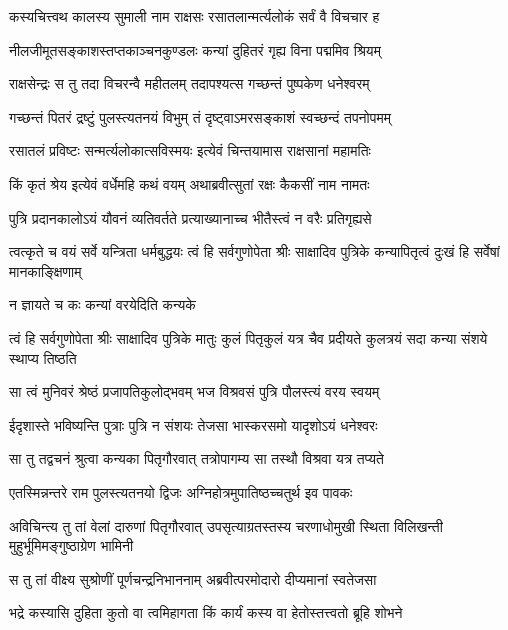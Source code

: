 
\twolineshloka
{कस्यचित्त्वथ कालस्य सुमाली नाम राक्षसः}
{रसातलान्मर्त्यलोकं सर्वं वै विचचार ह} %

\twolineshloka
{नीलजीमूतसङ्काशस्तप्तकाञ्चनकुण्डलः}
{कन्यां दुहितरं गृह्य विना पद्ममिव श्रियम्} %

\twolineshloka
{राक्षसेन्द्रः स तु तदा विचरन्वै महीतलम्}
{तदापश्यत्स गच्छन्तं पुष्पकेण धनेश्वरम्} %

\twolineshloka
{गच्छन्तं पितरं द्रष्टुं पुलस्त्यतनयं विभुम्}
{तं दृष्ट्वाऽमरसङ्काशं स्वच्छन्दं तपनोपमम्} %

\twolineshloka
{रसातलं प्रविष्टः सन्मर्त्यलोकात्सविस्मयः}
{इत्येवं चिन्तयामास राक्षसानां महामतिः} %

\twolineshloka
{किं कृतं श्रेय इत्येवं वर्धेमहि कथं वयम्}
{अथाब्रवीत्सुतां रक्षः कैकसीं नाम नामतः} %

\twolineshloka
{पुत्रि प्रदानकालोऽयं यौवनं व्यतिवर्तते}
{प्रत्याख्यानाच्च भीतैस्त्वं न वरैः प्रतिगृह्यसे} %

\threelineshloka
{त्वत्कृते च वयं सर्वे यन्त्रिता धर्मबुद्धयः}
{त्वं हि सर्वगुणोपेता श्रीः साक्षादिव पुत्रिके}
{कन्यापितृत्वं दुःखं हि सर्वेषां मानकाङ्क्षिणाम्} %

\onelineshloka
{न ज्ञायते च कः कन्यां वरयेदिति कन्यके} %

\threelineshloka
{त्वं हि सर्वगुणोपेता श्रीः साक्षादिव पुत्रिके}
{मातुः कुलं पितृकुलं यत्र चैव प्रदीयते}
{कुलत्रयं सदा कन्या संशये स्थाप्य तिष्ठति} %

\twolineshloka
{सा त्वं मुनिवरं श्रेष्ठं प्रजापतिकुलोद्भवम्}
{भज विश्रवसं पुत्रि पौलस्त्यं वरय स्वयम्} %

\twolineshloka
{ईदृशास्ते भविष्यन्ति पुत्राः पुत्रि न संशयः}
{तेजसा भास्करसमो यादृशोऽयं धनेश्वरः} %

\twolineshloka
{सा तु तद्वचनं श्रुत्वा कन्यका पितृगौरवात्}
{तत्रोपागम्य सा तस्थौ विश्रवा यत्र तप्यते} %

\twolineshloka
{एतस्मिन्नन्तरे राम पुलस्त्यतनयो द्विजः}
{अग्निहोत्रमुपातिष्ठच्चतुर्थ इव पावकः} %

\threelineshloka
{अविचिन्त्य तु तां वेलां दारुणां पितृगौरवात्}
{उपसृत्याग्रतस्तस्य चरणाधोमुखी स्थिता}
{विलिखन्ती मुहुर्भूमिमङ्गुष्ठाग्रेण भामिनी} %

\twolineshloka
{स तु तां वीक्ष्य सुश्रोणीं पूर्णचन्द्रनिभाननाम्}
{अब्रवीत्परमोदारो दीप्यमानां स्वतेजसा} %

\twolineshloka
{भद्रे कस्यासि दुहिता कुतो वा त्वमिहागता}
{किं कार्यं कस्य वा हेतोस्तत्त्वतो ब्रूहि शोभने} %

